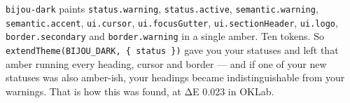 \texttt{b\allowbreak{}i\allowbreak{}j\allowbreak{}o\allowbreak{}u\allowbreak{}-\allowbreak{}d\allowbreak{}a\allowbreak{}r\allowbreak{}k} paints \texttt{s\allowbreak{}t\allowbreak{}a\allowbreak{}t\allowbreak{}u\allowbreak{}s\allowbreak{}.\allowbreak{}w\allowbreak{}a\allowbreak{}r\allowbreak{}n\allowbreak{}i\allowbreak{}n\allowbreak{}g}, \texttt{s\allowbreak{}t\allowbreak{}a\allowbreak{}t\allowbreak{}u\allowbreak{}s\allowbreak{}.\allowbreak{}a\allowbreak{}c\allowbreak{}t\allowbreak{}i\allowbreak{}v\allowbreak{}e}, \texttt{s\allowbreak{}e\allowbreak{}m\allowbreak{}a\allowbreak{}n\allowbreak{}t\allowbreak{}i\allowbreak{}c\allowbreak{}.\allowbreak{}w\allowbreak{}a\allowbreak{}r\allowbreak{}n\allowbreak{}i\allowbreak{}n\allowbreak{}g}, \texttt{s\allowbreak{}e\allowbreak{}m\allowbreak{}a\allowbreak{}n\allowbreak{}t\allowbreak{}i\allowbreak{}c\allowbreak{}.\allowbreak{}a\allowbreak{}c\allowbreak{}c\allowbreak{}e\allowbreak{}n\allowbreak{}t}, \texttt{u\allowbreak{}i\allowbreak{}.\allowbreak{}c\allowbreak{}u\allowbreak{}r\allowbreak{}s\allowbreak{}o\allowbreak{}r}, \texttt{u\allowbreak{}i\allowbreak{}.\allowbreak{}f\allowbreak{}o\allowbreak{}c\allowbreak{}u\allowbreak{}s\allowbreak{}G\allowbreak{}u\allowbreak{}t\allowbreak{}t\allowbreak{}e\allowbreak{}r}, \texttt{u\allowbreak{}i\allowbreak{}.\allowbreak{}s\allowbreak{}e\allowbreak{}c\allowbreak{}t\allowbreak{}i\allowbreak{}o\allowbreak{}n\allowbreak{}H\allowbreak{}e\allowbreak{}a\allowbreak{}d\allowbreak{}e\allowbreak{}r}, \texttt{u\allowbreak{}i\allowbreak{}.\allowbreak{}l\allowbreak{}o\allowbreak{}g\allowbreak{}o}, \texttt{b\allowbreak{}o\allowbreak{}r\allowbreak{}d\allowbreak{}e\allowbreak{}r\allowbreak{}.\allowbreak{}s\allowbreak{}e\allowbreak{}c\allowbreak{}o\allowbreak{}n\allowbreak{}d\allowbreak{}a\allowbreak{}r\allowbreak{}y} and \texttt{b\allowbreak{}o\allowbreak{}r\allowbreak{}d\allowbreak{}e\allowbreak{}r\allowbreak{}.\allowbreak{}w\allowbreak{}a\allowbreak{}r\allowbreak{}n\allowbreak{}i\allowbreak{}n\allowbreak{}g} in a single amber. Ten tokens. So \texttt{e\allowbreak{}x\allowbreak{}t\allowbreak{}e\allowbreak{}n\allowbreak{}d\allowbreak{}T\allowbreak{}h\allowbreak{}e\allowbreak{}m\allowbreak{}e\allowbreak{}(\allowbreak{}B\allowbreak{}I\allowbreak{}J\allowbreak{}O\allowbreak{}U\allowbreak{}\_\allowbreak{}D\allowbreak{}A\allowbreak{}R\allowbreak{}K\allowbreak{},\allowbreak{} \allowbreak{}\{\allowbreak{} \allowbreak{}s\allowbreak{}t\allowbreak{}a\allowbreak{}t\allowbreak{}u\allowbreak{}s\allowbreak{} \allowbreak{}\}\allowbreak{})} gave you your statuses and left that amber running every heading, cursor and border --- and if one of your new statuses was also amber-ish, your headings became indistinguishable from your warnings. That is how this was found, at ΔE 0.023 in OKLab.

